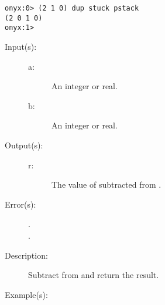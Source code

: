 \begin{description}
\begin{description}
\begin{verbatim}
onyx:0> (2 1 0) dup stuck pstack
(2 0 1 0)
onyx:1>
		\end{verbatim}
	\end{description}
\label{systemdict:sub}
\item[{\onyxop{a b}{sub}{r}}: ]
	\begin{description}\item[]
	\item[Input(s): ]
		\begin{description}\item[]
		\item[a: ]
			An integer or real.
		\item[b: ]
			An integer or real.
		\end{description}
	\item[Output(s): ]
		\begin{description}\item[]
		\item[r: ]
			The value of  subtracted from .
		\end{description}
	\item[Error(s): ]
		\begin{description}\item[]
		\item[.]
		\item[.]
		\end{description}
	\item[Description: ]
		Subtract  from  and return the result.
	\item[Example(s): ]\begin{verbatim}


\end{verbatim}
\end{description}
\end{description}
